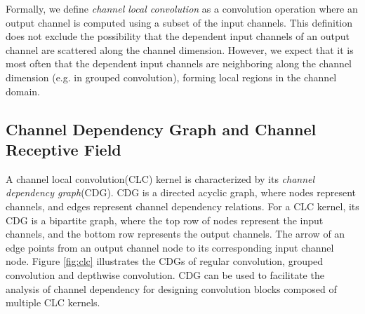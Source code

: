 \documentclass[10pt,twocolumn,letterpaper]{article}
\begin{document}
Formally, we define \textit{channel local convolution }as a convolution operation where an output channel is computed using a subset of the input channels. This definition does not exclude the possibility that the dependent input channels of an output channel are scattered along the channel dimension. However, we expect that it is most often that the dependent input channels are neighboring along the channel dimension (e.g. in grouped convolution), forming local regions in the channel domain. 

\subsection{Channel Dependency Graph and Channel Receptive Field}

A channel local convolution(CLC) kernel is characterized by its \textit{channel dependency graph}(CDG). CDG is a directed acyclic graph, where nodes represent channels, and edges represent channel dependency relations. For a CLC kernel, its CDG is a bipartite graph, where the top row of nodes represent the input channels, and the bottom row represents the output channels. The arrow of an edge points from an output channel node to its corresponding input channel node. Figure \ref{fig:clc} illustrates the CDGs of regular convolution, grouped convolution and depthwise convolution. CDG can be used to facilitate the analysis of channel dependency for designing convolution blocks composed of multiple CLC kernels.
\end{document}
